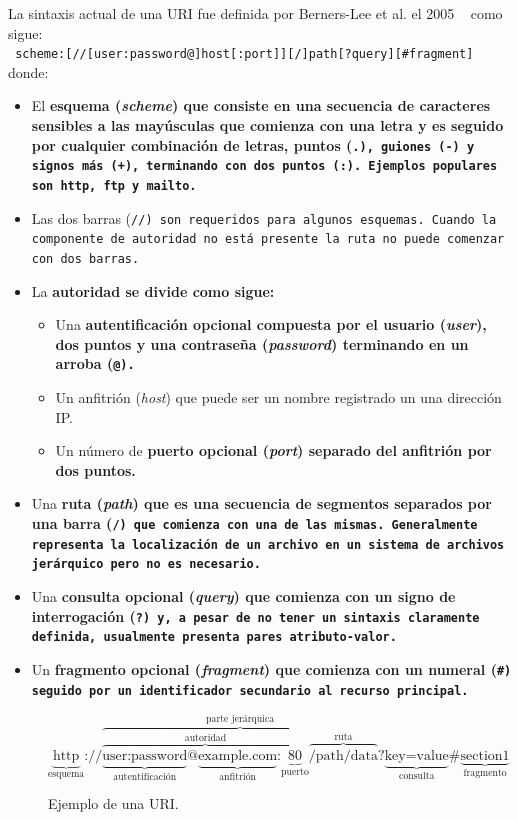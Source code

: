 La sintaxis actual de una URI fue definida por Berners-Lee et al. el
2005 ~\cite{berners2004uniform} como sigue:\\
\texttt{
  scheme:{[//{[user:password@]}host{[:port]}]}{[/]}path{[?query]}{[\#fragment]}
}\\
donde:
\begin{itemize}
  \item
    El \bf{esquema} (\emph{scheme}) que consiste en una secuencia de caracteres
    sensibles a las mayúsculas que comienza con una letra y es seguido por
    cualquier combinación de letras, puntos (\tt{.}), guiones (\tt{-}) y signos
    más (\tt{+}), terminando con dos puntos (\tt{:}). 
    Ejemplos populares son \tt{http}, \tt{ftp} y \tt{mailto}.
  \item
    Las dos barras (\tt{//}) son requeridos para algunos esquemas. Cuando la
    componente de autoridad no está presente la ruta no puede comenzar con dos
    barras.
  \item
    La \bf{autoridad} se divide como sigue:
    \begin{itemize}
      \item
        Una \bf{autentificación} opcional compuesta por el usuario
        (\emph{user}), dos puntos y una contraseña (\emph{password}) terminando
        en un arroba (\tt{@}).
      \item
        Un anfitrión (\emph{host}) que puede ser un nombre registrado un una
        dirección IP.
      \item
        Un número de \bf{puerto} opcional (\emph{port}) separado del anfitrión
        por dos puntos.
    \end{itemize}
  \item
    Una \bf{ruta} (\emph{path}) que es una secuencia de segmentos separados
    por una barra (\tt{/}) que comienza con una de las mismas. Generalmente
    representa la localización de un archivo en un sistema de archivos
    jerárquico pero no es necesario.
  \item
    Una \bf{consulta} opcional (\emph{query}) que comienza con un signo de
    interrogación (\tt{?}) y, a pesar de no tener un sintaxis claramente
    definida, usualmente presenta pares atributo-valor.
  \item
    Un \bf{fragmento} opcional (\emph{fragment}) que comienza con un numeral
    (\tt{\#}) seguido por un identificador secundario al recurso principal.
\end{itemize}

\begin{figure}[htpb]
  $$
    \underbrace{\text{http}}_{\text{esquema}}\text{://}
    \overbrace{
      \overbrace{
        \underbrace{\text{user:password}}_{\text{autentificación}}\text{@}
        \underbrace{\text{example.com}}_{\text{anfitrión}}\text{:}
        \underbrace{\text{80}}_{\text{puerto}}
      }^{\text{autoridad}}
      \overbrace{\text{/path/data}}^{\text{ruta}}
    }^{\text{parte jerárquica}}\text{?}
    \underbrace{\text{key=value}}_{\text{consulta}}\text{\#}
    \underbrace{\text{section1}}_{\text{fragmento}}
  $$
  \caption{Ejemplo de una URI.}
  \label{fig:uriex}
\end{figure}

